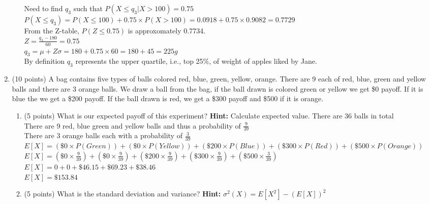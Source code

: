 \documentclass{article}%
\begin{document}
\begin{enumerate}
\begin{enumerate}
            Need to find $q_3$ such that $P(X \leq q_3 | X > 100) = 0.75$ \\

            $P(X \leq q_3) = P(X \leq 100) + 0.75 \times P(X > 100) = 0.0918 + 0.75 \times 0.9082 = 0.7729$\\
            From the Z-table, $P(Z \leq 0.75)$ is approxomately 0.7734.\\
            $Z = \frac{q_3 - 180}{60} = 0.75$\\

            $q_3 = \mu + Z \sigma = 180 + 0.75 \times 60 = 180 + 45 = 225g$\\

            By definition $q_3$ represents the upper quartile, i.e., top 25\%, of weight of apples liked by Jane.

    \end{enumerate}

    
    \item (10 points) A bag contains five types of balls colored red, blue, green, yellow, orange. There are 9 each of red, blue, green and yellow balls and there are 3 orange balls. We draw a ball from the bag, if the ball drawn is colored green or yellow we get \$0 payoff. If it is blue the we get a \$200 payoff. If the ball drawn is red, we get a \$300 payoff and \$500 if it is orange.
    \begin{enumerate}
        \item (5 points) What is our expected payoff of this experiment? \textbf{Hint:} Calculate expected value.
        There are 36 balls in total\\
        There are 9 red, blue green and yellow balls and thus a probability of $\frac{9}{39}$\\
        There are 3 orange balls each with a probability of $\frac{3}{39}$\\
        $E[X] = (\$0 \times P(Green)) + (\$0 \times P(Yellow)) + (\$200 \times P(Blue)) + (\$300 \times P(Red)) + (\$500 \times P(Orange))$\\
        $E[X] = (\$0 \times \frac{9}{39}) + (\$0 \times \frac{9}{39}) + (\$200 \times \frac{9}{39}) + (\$300 \times \frac{9}{39}) + (\$500 \times \frac{3}{39})$\\
        $E[X] = 0 + 0 + \$46.15 + \$69.23 + \$38.46$\\
        $E[X] = \$153.84$\\
    
        \item (5 points) What is the standard deviation and variance? \textbf{Hint:} $\sigma^2(X) = E[X^2] - (E[X])^2$
        

\end{enumerate}
\end{enumerate}
\end{document}
